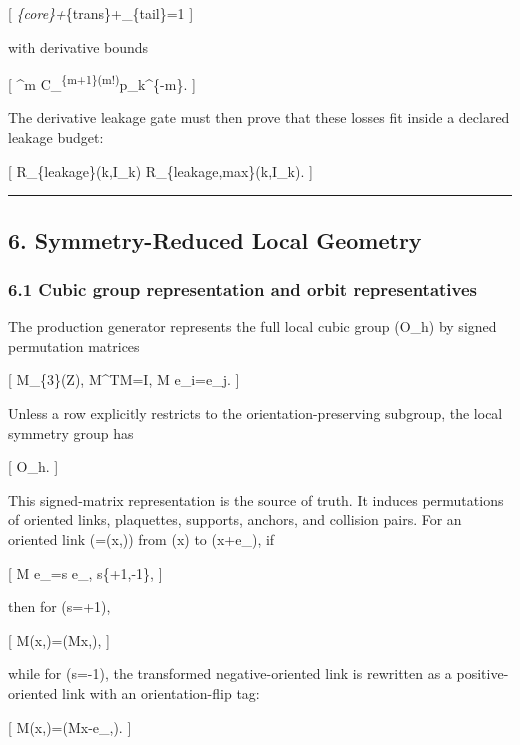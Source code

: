 \documentclass[
]{article}
\begin{document}
{[} \chi\emph{\{\rm core\}+\chi}\{\rm trans\}+\chi\_\{\rm tail\}=1 {]}

with derivative bounds

{[} \textbar{}\partial\^{}m\chi\textbar{}
\le C\_\chi\textsuperscript{\{m+1\}(m!)}\sigma p\_k\^{}\{-m\}. {]}

The derivative leakage gate must then prove that these losses fit inside
a declared leakage budget:

{[} R\_\{\rm leakage\}(k,I\_k) \le R\_\{\rm leakage,max\}(k,I\_k). {]}

\begin{center}\rule{0.5\linewidth}{0.5pt}\end{center}

\subsection{6. Symmetry-Reduced Local
Geometry}\label{symmetry-reduced-local-geometry}

\subsubsection{6.1 Cubic group representation and orbit
representatives}\label{cubic-group-representation-and-orbit-representatives}

The production generator represents the full local cubic group (O\_h) by
signed permutation matrices

{[} M\in {}\_\{3\}(\mathbb Z), \qquad M\^{}TM=I,
\qquad M e\_i=\pm e\_j. {]}

Unless a row explicitly restricts to the orientation-preserving
subgroup, the local symmetry group has

{[} \textbar O\_h. {]}

This signed-matrix representation is the source of truth. It induces
permutations of oriented links, plaquettes, supports, anchors, and
collision pairs. For an oriented link (\ell=(x,\mu)) from (x) to
(x+e\_\mu), if

{[} M e\_\mu=s e\_\nu, \qquad s\in\{+1,-1\}, {]}

then for (s=+1),

{[} M\cdot(x,\mu)=(Mx,\nu), {]}

while for (s=-1), the transformed negative-oriented link is rewritten as
a positive-oriented link with an orientation-flip tag:

{[} M\cdot(x,\mu)=(Mx-e\_\nu,\nu). {]}
\end{document}
